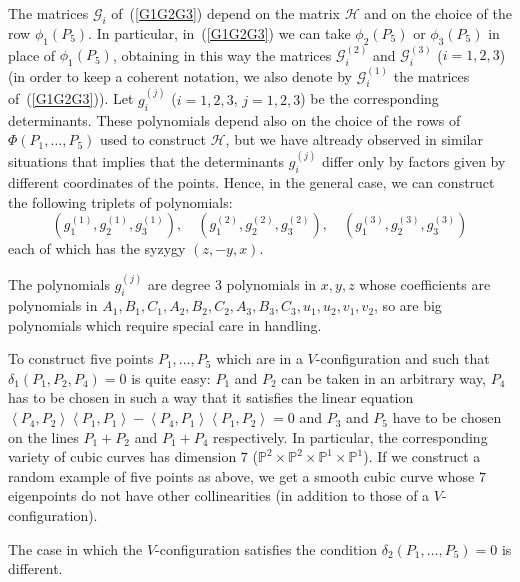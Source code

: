 \documentclass[12pt, a4paper, reqno, captions=tableheading,bibliography=totoc]{scrartcl}
\theoremstyle{plain}
\theoremstyle{definition}
\newcommand{\scl}[2]{\left\langle {#1}, {#2} \right\rangle}
\begin{document}
The matrices $\mathcal{G}_i$ of~(\ref{G1G2G3}) depend on the matrix
$\mathcal{H}$ and on the choice of the row $\phi_1(P_5)$. In particular,
in~(\ref{G1G2G3}) we can take $\phi_2(P_5)$ or $\phi_3(P_5)$ in place
of $\phi_1(P_5)$, obtaining in this way the matrices
$\mathcal{G}_i^{(2)}$ and $\mathcal{G}_i^{(3)}$ ($i=1, 2, 3$) (in order
to keep a coherent notation, we also denote by $\mathcal{G}_i^{(1)}$
the matrices of~(\ref{G1G2G3})). Let $g_i^{(j)}$ ($i=1, 2, 3$, $j = 1, 2, 3$)
be the corresponding determinants. These polynomials depend also on
the choice of the rows of $\Phi(P_1, \dots, P_5)$ used to construct
$\mathcal{H}$, but we have altready observed in similar situations that
 implies that the determinants $g_i^{(j)}$
differ only by factors given by different coordinates of the points.
Hence, in the general case, we can construct the following triplets of
polynomials:
\begin{equation}
\left(g_1^{(1)}, g_2^{(1)}, g_3^{(1)}\right),\quad
\left(g_1^{(2)}, g_2^{(2)}, g_3^{(2)}\right),\quad
\left(g_1^{(3)}, g_2^{(3)}, g_3^{(3)}\right)
\label{3tripletsPol}
\end{equation}
each of which has the syzygy $(z, -y, x)$.

The polynomials $g_i^{(j)}$ are degree $3$ polynomials in $x, y, z$ whose
coefficients are polynomials in $A_1, B_1, C_1, A_2, B_2, C_2, A_3, B_3, C_3,
u_1, u_2, v_1, v_2$, so are big polynomials which require
special care in handling.

To construct five points $P_1, \dots, P_5$ which are in a $V$-configuration
and such that $\delta_1(P_1, P_2, P_4)= 0$ is quite easy: $P_1$
and $P_2$ can be taken in an arbitrary way, $P_4$ has to be chosen in such
a way that it satisfies the linear
equation $\scl{P_4}{P_2}\scl{P_1}{P_1}-\scl{P_4}{P_1}\scl{P_1}{P_2} = 0$
and $P_3$ and $P_5$ have to be chosen on the lines $P_1+P_2$ and $P_1+P_4$
respectively. In particular, the corresponding variety of cubic curves
has dimension $7$ ($\mathbb{P}^2\times \mathbb{P}^2 \times
\mathbb{P}^1\times  \mathbb{P}^1$).
If we construct a random example
of five points as above, we get a smooth cubic curve whose $7$ eigenpoints
do not have other collinearities (in addition to those of a
$V$-configuration).

The case in which the $V$-configuration satisfies the condition
$\delta_2(P_1, \dots, P_5) = 0$ is different.
\end{document}
